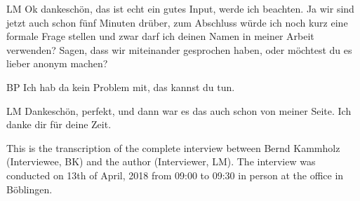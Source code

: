 \begin{xlist}
    \item[LM] Ok dankeschön, das ist echt ein gutes Input, werde ich beachten. Ja wir sind jetzt auch schon fünf Minuten drüber, zum Abschluss würde ich noch kurz eine formale Frage stellen und zwar darf ich deinen Namen in meiner Arbeit verwenden? Sagen, dass wir miteinander gesprochen haben, oder möchtest du es lieber anonym machen?
    \item[BP] Ich hab da kein Problem mit, das kannst du tun.
    \item[LM] Dankeschön, perfekt, und dann war es das auch schon von meiner Seite. Ich danke dir für deine Zeit. 
\end{xlist}

 \label{anhang:InterviewBK}

This is the transcription of the complete interview between Bernd Kammholz (Interviewee, BK) and the author (Interviewer, LM). The interview was conducted on 13th of April, 2018 from 09:00 to 09:30 in person at the office in Böblingen.

